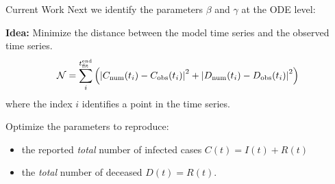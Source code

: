 \begin{slide}{Current Work}
	{\large Next we identify the parameters $\beta$ and $\gamma$ at the ODE level:} \\

	\vspace{.5cm}
	
	\textbf{Idea:} Minimize the distance between the model time series and the observed time series.
	\begin{equation*}
	\mathcal{N} = \sum_i^{t_\text{fit}^\text{end}} \left( \left| C_{\text{num}} (t_i) - C_{\text{obs}} (t_i) \right|^2 + \left| D_{\text{num}} (t_i) - D_{\text{obs}} (t_i) \right|^2 \right)
	\end{equation*}
	where the index $i$ identifies a point in the time series.\\
	
	\vspace{.5cm}
	
	Optimize the parameters to reproduce:
	\begin{itemize}
		\item the reported \emph{total} number of infected cases $C(t) = I(t) + R(t)$
		\item the \emph{total} number of deceased $D(t) = R(t)$.
	\end{itemize}

\end{slide}